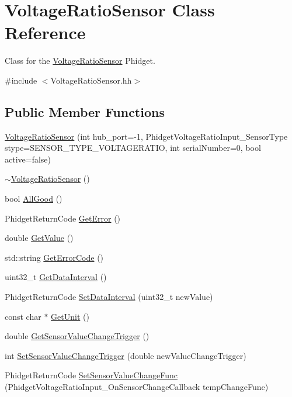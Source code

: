 \hypertarget{classVoltageRatioSensor}{}\section{Voltage\+Ratio\+Sensor Class Reference}
\label{classVoltageRatioSensor}


Class for the \hyperlink{classVoltageRatioSensor}{Voltage\+Ratio\+Sensor} Phidget.  




{\ttfamily \#include $<$Voltage\+Ratio\+Sensor.\+hh$>$}

\subsection*{Public Member Functions}
\begin{DoxyCompactItemize}
\item 
\hyperlink{classVoltageRatioSensor_a63e3c21125ddff16315f95fa62b8ff9c}{Voltage\+Ratio\+Sensor} (int hub\+\_\+port=-\/1, Phidget\+Voltage\+Ratio\+Input\+\_\+\+Sensor\+Type stype=S\+E\+N\+S\+O\+R\+\_\+\+T\+Y\+P\+E\+\_\+\+V\+O\+L\+T\+A\+G\+E\+R\+A\+T\+IO, int serial\+Number=0, bool active=false)
\item 
\hyperlink{classVoltageRatioSensor_ac0e023b5d45eec27ab92add6924b083b}{$\sim$\+Voltage\+Ratio\+Sensor} ()
\item 
bool \hyperlink{classVoltageRatioSensor_a33625c71e8e4a69be28360604ca14776}{All\+Good} ()
\item 
Phidget\+Return\+Code \hyperlink{classVoltageRatioSensor_ad5d715d963835a920e0ad89786f31899}{Get\+Error} ()
\item 
double \hyperlink{classVoltageRatioSensor_a6b4a3caac9216b8710e98bb504603a69}{Get\+Value} ()
\item 
std\+::string \hyperlink{classVoltageRatioSensor_ae30a69afe93b91dd21735bec89ee1dce}{Get\+Error\+Code} ()
\item 
uint32\+\_\+t \hyperlink{classVoltageRatioSensor_a4b1e9f2f81dd65b741369a5680ffe3e0}{Get\+Data\+Interval} ()
\item 
Phidget\+Return\+Code \hyperlink{classVoltageRatioSensor_ac89f4c06cb69bf4071fd965b51c3fa4e}{Set\+Data\+Interval} (uint32\+\_\+t new\+Value)
\item 
const char $\ast$ \hyperlink{classVoltageRatioSensor_a65c712b7dfdadf4fea644c249ac779ce}{Get\+Unit} ()
\item 
double \hyperlink{classVoltageRatioSensor_a9da4e001a5276d5058c765b394a98c36}{Get\+Sensor\+Value\+Change\+Trigger} ()
\item 
int \hyperlink{classVoltageRatioSensor_a99a4c1c3385ad27b76da87441f966641}{Set\+Sensor\+Value\+Change\+Trigger} (double new\+Value\+Change\+Trigger)
\item 
Phidget\+Return\+Code \hyperlink{classVoltageRatioSensor_ad6e2ac41c22ab8a9bafe95f68910d950}{Set\+Sensor\+Value\+Change\+Func} (Phidget\+Voltage\+Ratio\+Input\+\_\+\+On\+Sensor\+Change\+Callback temp\+Change\+Func)
\end{DoxyCompactItemize}


